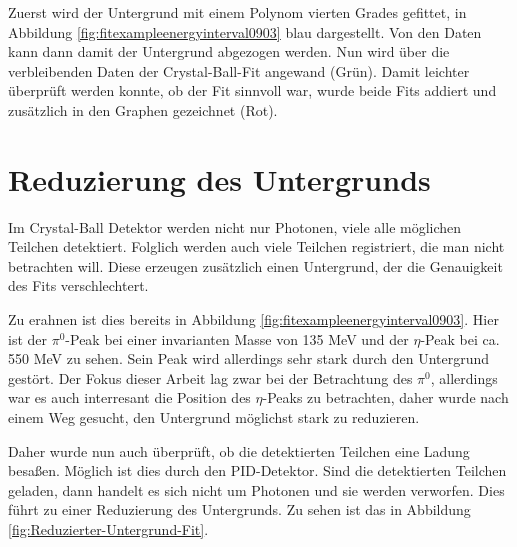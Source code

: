 \documentclass[a4paper,11pt,oneside,final,german,openbib,pdftex]{scrbook}
\begin{document}
{Zuerst wird der Untergrund mit einem Polynom vierten Grades gefittet, in Abbildung \ref{fig:fitexampleenergyinterval0903} blau dargestellt. Von den Daten kann dann damit der Untergrund abgezogen werden. Nun wird \"uber die verbleibenden Daten der Crystal-Ball-Fit angewand (Gr\"un). Damit leichter \"uberpr\"uft werden konnte, ob der Fit sinnvoll war, wurde beide Fits addiert und zus\"atzlich in den Graphen gezeichnet (Rot).
\newpage

\section{Reduzierung des Untergrunds}

Im Crystal-Ball Detektor werden nicht nur Photonen, viele alle m\"oglichen Teilchen detektiert. Folglich werden auch viele Teilchen registriert, die man nicht betrachten will. Diese erzeugen zus\"atzlich einen Untergrund, der die Genauigkeit des Fits verschlechtert.

Zu erahnen ist dies bereits in Abbildung \ref{fig:fitexampleenergyinterval0903}. Hier ist der $\pi^0$-Peak bei einer invarianten Masse von 135 MeV und der $\eta$-Peak bei ca. 550 MeV zu sehen. Sein Peak wird allerdings sehr stark durch den Untergrund gest\"ort. Der Fokus dieser Arbeit lag zwar bei der Betrachtung des $\pi^0$, allerdings war es auch interresant die Position des $\eta$-Peaks zu betrachten, daher wurde nach einem Weg gesucht, den Untergrund m\"oglichst stark zu reduzieren. 

Daher wurde nun auch \"uberpr\"uft, ob die detektierten Teilchen eine Ladung besa{\ss}en. M\"oglich ist dies durch den PID-Detektor. Sind die detektierten Teilchen geladen, dann handelt es sich nicht um Photonen und sie werden verworfen. Dies f\"uhrt zu einer Reduzierung des Untergrunds. Zu sehen ist das in Abbildung \ref{fig:Reduzierter-Untergrund-Fit}.


}
\end{document}
